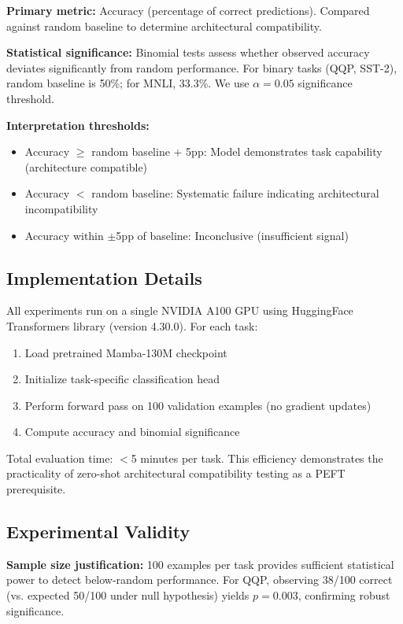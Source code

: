 \textbf{Primary metric:} Accuracy (percentage of correct predictions). Compared against random baseline to determine architectural compatibility.

\textbf{Statistical significance:} Binomial tests assess whether observed accuracy deviates significantly from random performance. For binary tasks (QQP, SST-2), random baseline is 50\%; for MNLI, 33.3\%. We use $\alpha = 0.05$ significance threshold.

\textbf{Interpretation thresholds:}
\begin{itemize}
\item Accuracy $\geq$ random baseline + 5pp: Model demonstrates task capability (architecture compatible)
\item Accuracy $<$ random baseline: Systematic failure indicating architectural incompatibility
\item Accuracy within $\pm$5pp of baseline: Inconclusive (insufficient signal)
\end{itemize}

\subsection{Implementation Details}

All experiments run on a single NVIDIA A100 GPU using HuggingFace Transformers library (version 4.30.0). For each task:

\begin{enumerate}
\item Load pretrained Mamba-130M checkpoint
\item Initialize task-specific classification head
\item Perform forward pass on 100 validation examples (no gradient updates)
\item Compute accuracy and binomial significance
\end{enumerate}

Total evaluation time: $<$5 minutes per task. This efficiency demonstrates the practicality of zero-shot architectural compatibility testing as a PEFT prerequisite.

\subsection{Experimental Validity}

\textbf{Sample size justification:} 100 examples per task provides sufficient statistical power to detect below-random performance. For QQP, observing 38/100 correct (vs. expected 50/100 under null hypothesis) yields $p = 0.003$, confirming robust significance.

